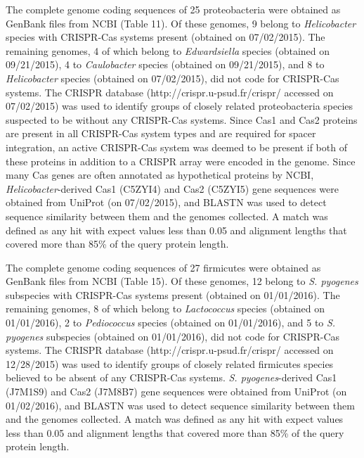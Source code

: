 \documentclass[english]{article}
\begin{document}
The complete genome coding sequences of 25 proteobacteria were
obtained as GenBank files from NCBI (Table 11). Of these genomes, 9
belong to \textit{Helicobacter} species with CRISPR-Cas systems present
(obtained on 07/02/2015). The remaining genomes, 4 of which belong
to \textit{Edwardsiella} species (obtained on 09/21/2015), 4 to
\textit{Caulobacter} species (obtained on 09/21/2015), and 8 to
\textit{Helicobacter} species (obtained on 07/02/2015), did not 
code for CRISPR-Cas systems. The CRISPR database 
(http://crispr.u-psud.fr/crispr/ accessed on
07/02/2015) was used to identify groups of closely related
proteobacteria species suspected to be without any CRISPR-Cas systems.
Since Cas1 and Cas2 proteins are present in all CRISPR-Cas system
types and are required for spacer integration, an active CRISPR-Cas
system was deemed to be present if both of these proteins in addition
to a CRISPR array were encoded in the genome. Since many Cas genes
are often annotated as hypothetical proteins by NCBI,
\textit{Helicobacter}-derived Cas1 (C5ZYI4) and Cas2 (C5ZYI5) gene sequences
were obtained from UniProt (on 07/02/2015), and BLASTN was used to
detect sequence similarity between them and the genomes collected. A
match was defined as any hit with expect values less than 0.05 and
alignment lengths that covered more than 85\% of the query protein
length.

The complete genome coding sequences of 27 firmicutes were
obtained as GenBank files from NCBI (Table 15). Of these genomes, 12
belong to \textit{S. pyogenes} subspecies with CRISPR-Cas systems
present
(obtained on 01/01/2016). The remaining genomes, 8 of which belong
to \textit{Lactococcus} species (obtained on 01/01/2016), 2 to
\textit{Pediococcus} species (obtained on 01/01/2016), and 5 to
\textit{S. pyogenes} subspecies (obtained on 01/01/2016), did not
code for CRISPR-Cas systems. The CRISPR database
(http://crispr.u-psud.fr/crispr/ accessed on
12/28/2015) was used to identify groups of closely related
firmicutes species believed to be absent of any CRISPR-Cas systems.
\textit{S. pyogenes}-derived Cas1 (J7M1S9) and Cas2 (J7M8B7) gene
sequences were obtained from UniProt (on 01/02/2016), and BLASTN was used to
detect sequence similarity between them and the genomes collected. A
match was defined as any hit with expect values less than 0.05 and
alignment lengths that covered more than 85\% of the query protein
length.
\end{document}
